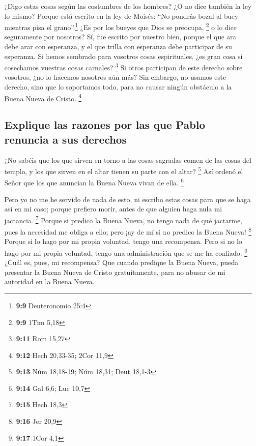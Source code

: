 \begin{paracol}{2}
 ¿Digo estas cosas según las costumbres de los hombres? ¿O
no dice también la ley lo mismo?  Porque está escrito en
la ley de Moisés: ``No pondrás bozal al buey mientras pisa el
grano''.\footnote{\textbf{9:9} Deuteronomio 25:4} ¿Es por los bueyes que
Dios se preocupa, \footnote{\textbf{9:9} 1Tim 5,18}  o lo
dice seguramente por nosotros? Sí, fue escrito por nuestro bien, porque
el que ara debe arar con esperanza, y el que trilla con esperanza debe
participar de su esperanza.  Si hemos sembrado para
vosotros cosas espirituales, ¿es gran cosa si cosechamos vuestras cosas
carnales? \footnote{\textbf{9:11} Rom 15,27}  Si otros
participan de este derecho sobre vosotros, ¿no lo hacemos nosotros aún
más? Sin embargo, no usamos este derecho, sino que lo soportamos todo,
para no causar ningún obstáculo a la Buena Nueva de Cristo. \footnote{\textbf{9:12}
  Hech 20,33-35; 2Cor 11,9}

\hypertarget{explique-las-razones-por-las-que-pablo-renuncia-a-sus-derechos}{%
\subsection{Explique las razones por las que Pablo renuncia a sus
derechos}\label{explique-las-razones-por-las-que-pablo-renuncia-a-sus-derechos}}

 ¿No sabéis que los que sirven en torno a las cosas
sagradas comen de las cosas del templo, y los que sirven en el altar
tienen su parte con el altar? \footnote{\textbf{9:13} Núm 18,18-19; Núm
  18,31; Deut 18,1-3}  Así ordenó el Señor que los que
anuncian la Buena Nueva vivan de ella. \footnote{\textbf{9:14} Gal 6,6;
  Luc 10,7}

 Pero yo no me he servido de nada de esto, ni escribo
estas cosas para que se haga así en mi caso; porque prefiero morir,
antes de que alguien haga nula mi jactancia. \footnote{\textbf{9:15}
  Hech 18,3}  Porque si predico la Buena Nueva, no tengo
nada de qué jactarme, pues la necesidad me obliga a ello; pero ¡ay de mí
si no predico la Buena Nueva! \footnote{\textbf{9:16} Jer 20,9}
 Porque si lo hago por mi propia voluntad, tengo una
recompensa. Pero si no lo hago por mi propia voluntad, tengo una
administración que se me ha confiado. \footnote{\textbf{9:17} 1Cor 4,1}
 ¿Cuál es, pues, mi recompensa? Que cuando predique la
Buena Nueva, pueda presentar la Buena Nueva de Cristo gratuitamente,
para no abusar de mi autoridad en la Buena Nueva.


\end{paracol}
